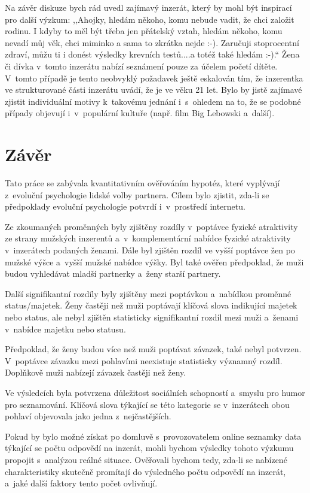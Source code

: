 \documentclass[a4paper, 12pt, notitlepage, oneside, numbers=noenddot]{report}
\begin{document}
Na závěr diskuze bych rád uvedl zajímavý inzerát, který by mohl být
inspirací pro další výzkum: ,,Ahojky, hledám někoho, komu nebude
vadit, že chci založit rodinu. I kdyby to měl být třeba jen přátelský
vztah, hledám někoho, komu nevadí můj věk, chci miminko a sama to
zkrátka nejde :-). Zaručuji stoprocentní zdraví, můžu ti i donést
výsledky krevních testů....a totéž také hledám :-).`` Žena či dívka
v~tomto inzerátu nabízí seznámení pouze za účelem početí dítěte.
V~tomto případě je tento neobvyklý požadavek ještě eskalován tím, že
inzerentka ve strukturované části inzerátu uvádí, že je ve věku 21
let. Bylo by jistě zajímavé zjistit individuální motivy k~takovému
jednání i~s~ohledem na to, že se podobné případy objevují
i~v~populární kultuře (např. film Big Lebowski a~další).

\chapter{Závěr}

Tato práce se zabývala kvantitativním ověřováním hypotéz, které
vyplývají z~evoluční psychologie lidské volby partnera.  Cílem bylo
zjistit, zda-li se předpoklady evoluční psychologie potvrdí
i~v~prostředí internetu.

Ze zkoumaných proměnných byly zjištěny rozdíly v~poptávce fyzické
atraktivity ze strany mužských inzerentů a~v~komplementární nabídce
fyzické atraktivity v~inzerátech podaných ženami.  Dále byl zjištěn
rozdíl ve vyšší poptávce žen po mužské výšce a~vyšší mužské nabídce
výšky.  Byl také ověřen před\-po\-klad, že muži budou vyhledávat
mladší partnerky a~ženy starší partnery.

Další signifikantní rozdíly byly zjištěny mezi poptávkou a~nabídkou
proměnné status/majetek.  Ženy častěji než muži poptávají klíčová
slova indikující majetek nebo status, ale nebyl zjištěn statisticky
signifikantní rozdíl mezi muži a~ženami v~nabídce majetku nebo statusu.

Předpoklad, že ženy budou více než muži poptávat závazek, také nebyl
potvrzen.  V~poptávce závazku mezi pohlavími neexistuje statisticky
významný rozdíl.  Doplňkově muži nabízejí závazek častěji než ženy.

Ve výsledcích byla potvrzena důležitost sociálních schopností a~smyslu
pro humor pro seznamování.  Klíčová slova týkající se této kategorie
se v~inzerátech obou pohlaví objevovala jako jedna z~nejčastějších.

Pokud by bylo možné získat po domluvě s~provozovatelem online seznamky
data týkající se počtu odpovědí na inzerát, mohli bychom výsledky
tohoto výzkumu propojit s~analýzou reálné situace.  Ověřovali bychom
tedy, zda-li se nabízené charakteristiky skutečně promítají do
výsledného počtu odpovědí na inzerát, a~jaké další faktory tento počet
ovlivňují.
\end{document}
